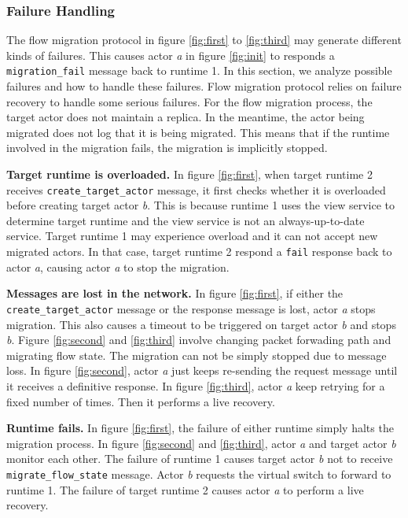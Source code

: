 \subsubsection{Failure Handling}
 
The flow migration protocol in figure \ref{fig:first} to \ref{fig:third} may
generate different kinds of failures. This causes actor \textit{a} in figure
\ref{fig:init} to responds a {\tt migration\_fail} message back to runtime 1. In
this section, we analyze possible failures and how to handle these failures.
Flow migration protocol relies on failure recovery to handle some serious
failures. For the flow migration process, the target actor does not maintain a
replica. In the meantime, the actor being migrated does not log that it is being
migrated. This means that if the runtime involved in the migration fails, the
migration is implicitly stopped.

\textbf{Target runtime is overloaded.} In figure \ref{fig:first},
when target runtime 2 receives {\tt create\_target\_actor} message, it first
checks whether it is overloaded before creating target actor \textit{b}.
This is because runtime 1 uses the view service to determine target runtime and
the view service is not an always-up-to-date service. Target runtime 1 may
experience overload and it can not accept new migrated actors. In that case,
target runtime 2 respond a {\tt fail} response back to actor \textit{a}, causing
actor \textit{a} to stop the migration.

\textbf{Messages are lost in the network.} In figure \ref{fig:first}, if either
the {\tt create\_target\_actor} message or the response message is lost, actor
\textit{a} stops migration. This also causes a timeout to be triggered on target
actor \textit{b} and stops \textit{b}. Figure \ref{fig:second} and
\ref{fig:third} involve changing packet forwading path and migrating flow state.
The migration can not be simply stopped due to message loss. In figure
\ref{fig:second}, actor \textit{a} just keeps re-sending the request message
until it receives a definitive response. In figure \ref{fig:third}, actor
\textit{a} keep retrying for a fixed number of times. Then it performs a live
recovery.

\textbf{Runtime fails.} In figure \ref{fig:first}, the failure of either runtime
simply halts the migration process. In figure \ref{fig:second} and
\ref{fig:third}, actor \textit{a} and target actor \textit{b} monitor each
other. The failure of runtime 1 causes target actor \textit{b} not to receive
{\tt migrate\_flow\_state} message. Actor \textit{b} requests the virtual switch
to forward to runtime 1. The failure of target runtime 2 causes actor \textit{a}
to perform a live recovery. 


